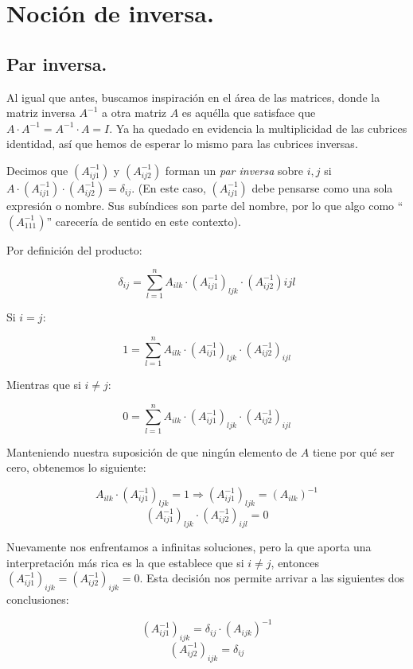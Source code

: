 \documentclass[a4paper, titlepage]{article}
\begin{document}
\section{Noción de inversa.}

\subsection{Par inversa.}

Al igual que antes, buscamos inspiración en el área de las matrices, donde la matriz inversa $A^{-1}$ a otra matriz $A$ es aquélla que satisface que ${A\cdot A^{-1} = A^{-1} \cdot A = I}$. Ya ha quedado en evidencia la multiplicidad de las cubrices identidad, así que hemos de esperar lo mismo para las cubrices inversas.

Decimos que $(A_{ij1}^{-1})$ y $(A_{ij2}^{-1})$ forman un \textit{par inversa} sobre $i,j$ si ${A\cdot (A_{ij1}^{-1}) \cdot (A_{ij2}^{-1}) = \delta_{ij}}$. (En este caso, $(A_{ij1}^{-1})$ debe pensarse como una sola expresión o nombre. Sus subíndices son parte del nombre, por lo que algo como ``$(A_{111}^{-1})$'' carecería de sentido en este contexto).

Por definición del producto:

$$\delta_{ij} = \sum\limits_{l=1}^{n} A_{ilk} \cdot (A_{ij1}^{-1})_{ljk} \cdot (A_{ij2}^{-1})ijl$$

Si $i = j$:

$$1 = \sum\limits_{l=1}^{n} A_{ilk} \cdot (A_{ij1}^{-1})_{ljk} \cdot (A_{ij2}^{-1})_{ijl}$$

Mientras que si $i \neq j$:

$$0 = \sum\limits_{l=1}^{n} A_{ilk} \cdot (A_{ij1}^{-1})_{ljk} \cdot (A_{ij2}^{-1})_{ijl}$$

Manteniendo nuestra suposición de que ningún elemento de $A$ tiene por qué ser cero, obtenemos lo siguiente:

$$A_{ilk} \cdot (A_{ij1}^{-1})_{ljk} = 1 \Rightarrow (A_{ij1}^{-1})_{ljk} = (A_{ilk})^{-1}$$
$$(A_{ij1}^{-1})_{ljk} \cdot (A_{ij2}^{-1})_{ijl} = 0$$

Nuevamente nos enfrentamos a infinitas soluciones, pero la que aporta una interpretación más rica es la que establece que si ${i \neq j}$, entonces ${(A_{ij1}^{-1})_{ijk} = (A_{ij2}^{-1})_{ijk} = 0}$. Esta decisión nos permite arrivar a las siguientes dos conclusiones:

$$(A_{ij1}^{-1})_{ijk} = \delta_{ij} \cdot (A_{ijk})^{-1}$$
$$(A_{ij2}^{-1})_{ijk} = \delta_{ij}$$
\end{document}

